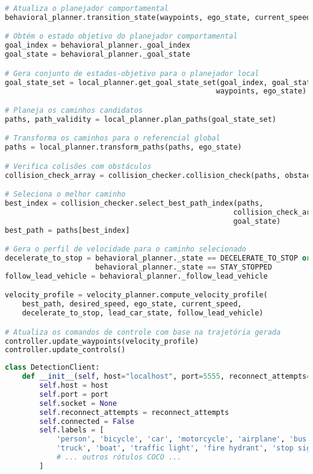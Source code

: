\documentclass[
	12pt,				%
	oneside, %
	a4paper,			%
	english,			%
	french,				%
	spanish,			%
	brazil				%
	]{abntex2}
\begin{document}
\begin{apendicesenv}
\begin{lstlisting}[language=Python, caption=Ciclo principal de planejamento hierárquico., label=lst:planning_main_loop]
# Atualiza o planejador comportamental
behavioral_planner.transition_state(waypoints, ego_state, current_speed)

# Obtém o estado objetivo do planejador comportamental
goal_index = behavioral_planner._goal_index
goal_state = behavioral_planner._goal_state

# Gera conjunto de estados-objetivo para o planejador local
goal_state_set = local_planner.get_goal_state_set(goal_index, goal_state, 
                                                 waypoints, ego_state)

# Planeja os caminhos candidatos
paths, path_validity = local_planner.plan_paths(goal_state_set)

# Transforma os caminhos para o referencial global
paths = local_planner.transform_paths(paths, ego_state)

# Verifica colisões com obstáculos
collision_check_array = collision_checker.collision_check(paths, obstacles)

# Seleciona o melhor caminho
best_index = collision_checker.select_best_path_index(paths, 
                                                     collision_check_array, 
                                                     goal_state)
best_path = paths[best_index]

# Gera o perfil de velocidade para o caminho selecionado
decelerate_to_stop = behavioral_planner._state == DECELERATE_TO_STOP or \
                     behavioral_planner._state == STAY_STOPPED
follow_lead_vehicle = behavioral_planner._follow_lead_vehicle

velocity_profile = velocity_planner.compute_velocity_profile(
    best_path, desired_speed, ego_state, current_speed,
    decelerate_to_stop, lead_car_state, follow_lead_vehicle)

# Atualiza os comandos de controle com base na trajetória gerada
controller.update_waypoints(velocity_profile)
controller.update_controls()
\end{lstlisting}

\begin{lstlisting}[language=Python, caption=Inicialização do cliente de detecção., label=lst:detector_client_init]
class DetectionClient:
    def __init__(self, host="localhost", port=5555, reconnect_attempts=3):
        self.host = host
        self.port = port
        self.socket = None
        self.reconnect_attempts = reconnect_attempts
        self.connected = False
        self.labels = [
            'person', 'bicycle', 'car', 'motorcycle', 'airplane', 'bus', 'train',
            'truck', 'boat', 'traffic light', 'fire hydrant', 'stop sign',
            # ... outros rótulos COCO ...
        ]


\end{lstlisting}
\end{apendicesenv}
\end{document}
